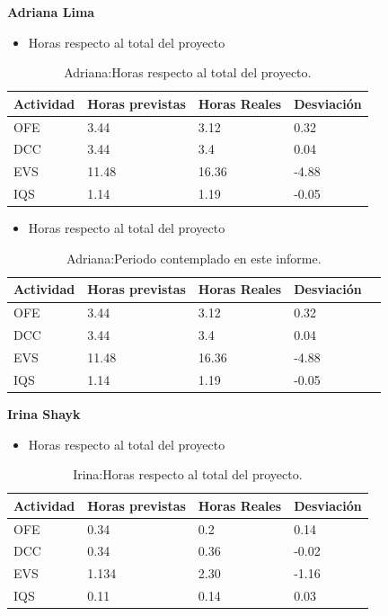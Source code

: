 \textbf{Adriana Lima}
\begin{itemize}
\item Horas respecto al total del proyecto
\end{itemize}
\begin{table}[H]
\begin{center}
\begin{tabular}{ l l l l }
	Actividad & Horas previstas & Horas Reales & Desviación \\ \hline \hline
  	OFE & 3.44 & 3.12 & 0.32 \\ \hline
  	DCC & 3.44 & 3.4 & 0.04 \\ \hline
  	EVS & 11.48 & 16.36 & -4.88 \\ \hline
  	IQS & 1.14 & 1.19 & -0.05 \\ \hline
\end{tabular}
\caption{Adriana:Horas respecto al total del proyecto.}
\label{tab:Adriana:HorasTotalInforme}
\end{center}
\end{table}

\begin{itemize}
\item Horas respecto al total del proyecto
\end{itemize}
\begin{table}[H]
\begin{center}
\begin{tabular}{ l l l l l }
  Actividad & Horas previstas & Horas Reales & Desviación \\ \hline \hline
    OFE & 3.44 & 3.12 & 0.32 \\ \hline
    DCC & 3.44 & 3.4 & 0.04 \\ \hline
    EVS & 11.48 & 16.36 & -4.88 \\ \hline
    IQS & 1.14 & 1.19 & -0.05 \\ \hline
\end{tabular}
\caption{Adriana:Periodo contemplado en este informe.}
\label{tab:Adriana:PeriodoContempladoInforme}
\end{center}
\end{table}


\newpage


\textbf{Irina Shayk}
\begin{itemize}
\item Horas respecto al total del proyecto
\end{itemize}
\begin{table}[H]
\begin{center}
\begin{tabular}{ l l l l }
	Actividad & Horas previstas & Horas Reales & Desviación \\ \hline \hline
  	OFE & 0.34 & 0.2 & 0.14\\ \hline
  	DCC & 0.34 & 0.36 & -0.02 \\ \hline
  	EVS & 1.134 & 2.30 & -1.16 \\ \hline
  	IQS & 0.11 & 0.14 & 0.03 \\ \hline
\end{tabular}
\caption{Irina:Horas respecto al total del proyecto.}
\label{tab:Irina:HorasTotalInforme}
\end{center}
\end{table}

